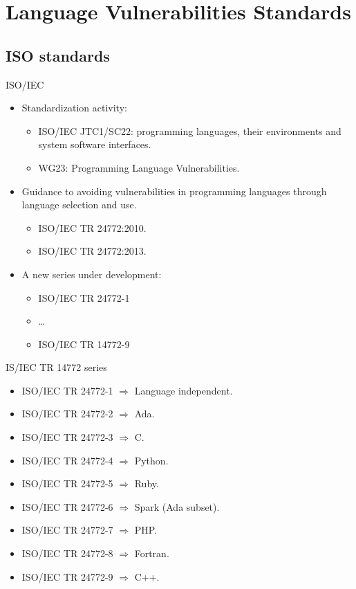 \section{Language Vulnerabilities Standards}

\subsection{ISO standards}

\begin{frame}[t]{ISO/IEC}
\begin{itemize}
  \item Standardization activity:
    \begin{itemize}
      \item ISO/IEC JTC1/SC22: programming languages, their environments and system software interfaces.
      \item WG23: Programming Language Vulnerabilities.
    \end{itemize}

  \vfill\pause
  \item Guidance to avoiding vulnerabilities in programming languages through language selection and use.
    \begin{itemize}
      \item ISO/IEC TR 24772:2010.
      \item ISO/IEC TR 24772:2013.
    \end{itemize}

  \vfill\pause
  \item A new series under development:
    \begin{itemize}
      \item ISO/IEC TR 24772-1
      \item \ldots
      \item ISO/IEC TR 14772-9
    \end{itemize} 
\end{itemize}
\end{frame}

\begin{frame}[t]{IS/IEC TR 14772 series}
\begin{itemize}
  \item ISO/IEC TR 24772-1 $\Rightarrow$ Language independent.
  \item ISO/IEC TR 24772-2 $\Rightarrow$ Ada.
  \item ISO/IEC TR 24772-3 $\Rightarrow$ C.
  \item ISO/IEC TR 24772-4 $\Rightarrow$ Python.
  \item ISO/IEC TR 24772-5 $\Rightarrow$ Ruby.
  \item ISO/IEC TR 24772-6 $\Rightarrow$ Spark (Ada subset).
  \item ISO/IEC TR 24772-7 $\Rightarrow$ PHP.
  \item ISO/IEC TR 24772-8 $\Rightarrow$ Fortran.
  \item ISO/IEC TR 24772-9 $\Rightarrow$ C++.
\end{itemize}
\end{frame}

